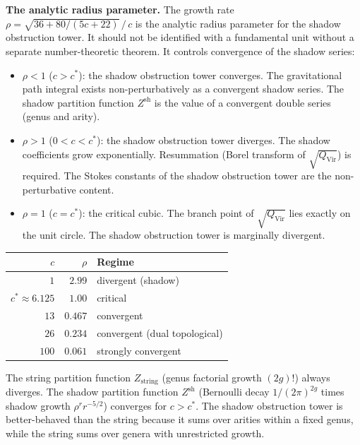 \documentclass[11pt]{article}
\begin{document}
\noindent\textbf{The analytic radius parameter.}\enspace
The growth rate
$\rho = \sqrt{36 + 80/(5c{+}22)}\,/\,c$ is the analytic radius
parameter for the shadow obstruction tower.  It should not be
identified with a fundamental unit without a separate
number-theoretic theorem.  It controls convergence of the shadow
series:
\begin{itemize}[nosep]
\item $\rho < 1$ ($c > c^*$): the shadow obstruction tower converges.  The
  gravitational path integral exists non-perturbatively as a
  convergent shadow series.  The shadow partition function
  $Z^{\mathrm{sh}}$ is the value of a convergent double series
  (genus and arity).
\item $\rho > 1$ ($0 < c < c^*$): the shadow obstruction tower diverges.
  The shadow coefficients grow exponentially.  Resummation
  (Borel transform of $\sqrt{Q_{\mathrm{Vir}}}$) is required.
  The Stokes constants of the shadow obstruction tower are the
  non-perturbative content.
\item $\rho = 1$ ($c = c^*$): the critical cubic.  The branch
  point of $\sqrt{Q_{\mathrm{Vir}}}$ lies exactly on the unit
  circle.  The shadow obstruction tower is marginally divergent.
\end{itemize}

\begin{center}
\small
\renewcommand{\arraystretch}{1.15}
\begin{tabular}{@{}rrl@{}}
$c$ & $\rho$ & \textbf{Regime} \\
\hline
$1$ & $2.99$ & divergent (shadow) \\
$c^* \approx 6.125$ & $1.00$ & critical \\
$13$ & $0.467$ & convergent \\
$26$ & $0.234$ & convergent (dual topological) \\
$100$ & $0.061$ & strongly convergent
\end{tabular}
\end{center}

\medskip

The string partition function $Z_{\mathrm{string}}$ (genus
factorial growth $(2g)!$) always diverges.  The shadow partition
function $Z^{\mathrm{sh}}$ (Bernoulli decay $1/(2\pi)^{2g}$
times shadow growth $\rho^r r^{-5/2}$) converges for $c > c^*$.
The shadow obstruction tower is better-behaved than the string because it
sums over arities within a fixed genus, while the string sums
over genera with unrestricted growth.
\end{document}
